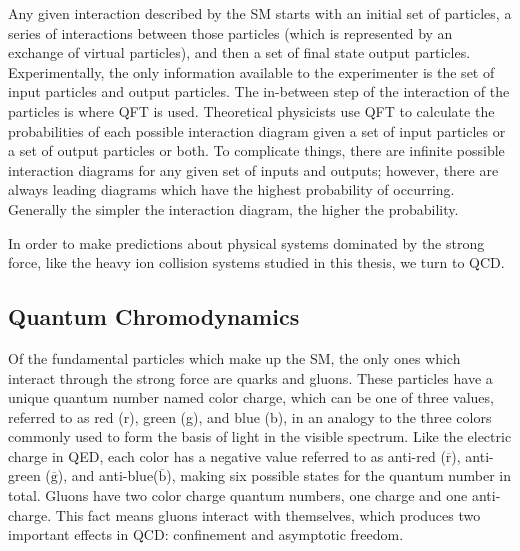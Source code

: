 Any given interaction described by the SM starts with an initial set of particles, a series of interactions between those particles (which is represented by an exchange of virtual particles), and then a set of final state output particles. Experimentally, the only information available to the experimenter is the set of input particles and output particles. The in-between step of the interaction of the particles is where QFT is used. Theoretical physicists use QFT to calculate the probabilities of each possible interaction diagram given a set of input particles or a set of output particles or both. To complicate things, there are infinite possible interaction diagrams for any given set of inputs and outputs; however, there are always leading diagrams which have the highest probability of occurring. Generally the simpler the interaction diagram, the higher the probability.

In order to make predictions about physical systems dominated by the strong force, like the heavy ion collision systems studied in this thesis, we turn to QCD. 

\subsection{Quantum Chromodynamics}
Of the fundamental particles which make up the SM, the only ones  which interact through the strong force are quarks and gluons. 
These particles have a unique quantum number named color charge, which can be one of three values, referred to as
red (r), green (g), and blue (b), in an analogy to the three colors commonly used to form the basis of light in the visible spectrum. Like the electric
charge in QED, each color has a negative value referred to as anti-red ($\overline{\text{r}}$), anti-green ($\overline{\text{g}}$), and anti-blue($\overline{\text{b}}$), making six possible states for the quantum number in total. Gluons have two color charge quantum numbers, one charge and one anti-charge. This fact means gluons interact with themselves, which produces two important effects in QCD: confinement and asymptotic freedom.


